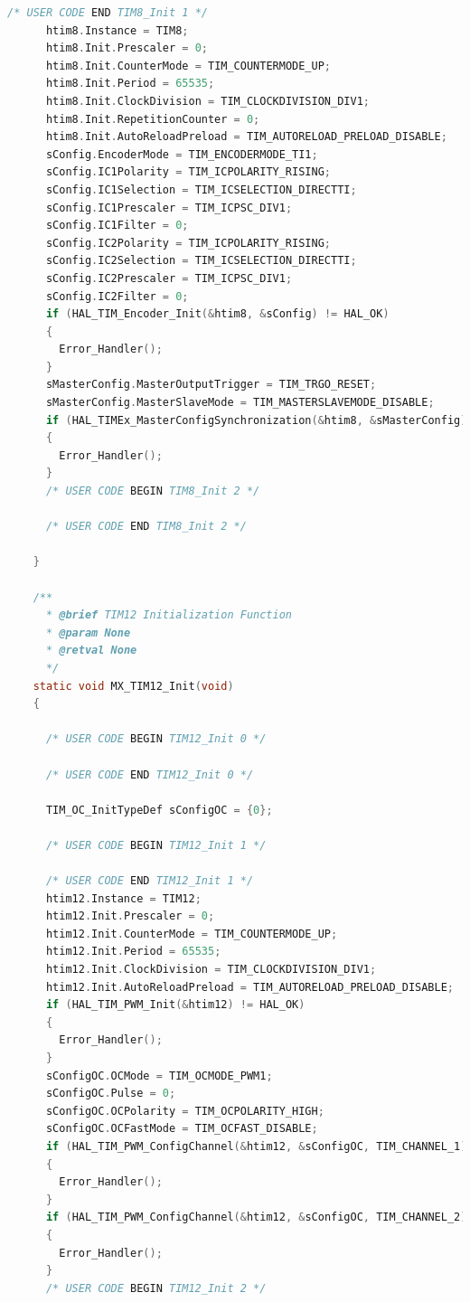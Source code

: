\begin{lstlisting}[language=C, caption=メインコード(main.c)]
      /* USER CODE END TIM8_Init 1 */
      htim8.Instance = TIM8;
      htim8.Init.Prescaler = 0;
      htim8.Init.CounterMode = TIM_COUNTERMODE_UP;
      htim8.Init.Period = 65535;
      htim8.Init.ClockDivision = TIM_CLOCKDIVISION_DIV1;
      htim8.Init.RepetitionCounter = 0;
      htim8.Init.AutoReloadPreload = TIM_AUTORELOAD_PRELOAD_DISABLE;
      sConfig.EncoderMode = TIM_ENCODERMODE_TI1;
      sConfig.IC1Polarity = TIM_ICPOLARITY_RISING;
      sConfig.IC1Selection = TIM_ICSELECTION_DIRECTTI;
      sConfig.IC1Prescaler = TIM_ICPSC_DIV1;
      sConfig.IC1Filter = 0;
      sConfig.IC2Polarity = TIM_ICPOLARITY_RISING;
      sConfig.IC2Selection = TIM_ICSELECTION_DIRECTTI;
      sConfig.IC2Prescaler = TIM_ICPSC_DIV1;
      sConfig.IC2Filter = 0;
      if (HAL_TIM_Encoder_Init(&htim8, &sConfig) != HAL_OK)
      {
        Error_Handler();
      }
      sMasterConfig.MasterOutputTrigger = TIM_TRGO_RESET;
      sMasterConfig.MasterSlaveMode = TIM_MASTERSLAVEMODE_DISABLE;
      if (HAL_TIMEx_MasterConfigSynchronization(&htim8, &sMasterConfig) != HAL_OK)
      {
        Error_Handler();
      }
      /* USER CODE BEGIN TIM8_Init 2 */
    
      /* USER CODE END TIM8_Init 2 */
    
    }
    
    /**
      * @brief TIM12 Initialization Function
      * @param None
      * @retval None
      */
    static void MX_TIM12_Init(void)
    {
    
      /* USER CODE BEGIN TIM12_Init 0 */
    
      /* USER CODE END TIM12_Init 0 */
    
      TIM_OC_InitTypeDef sConfigOC = {0};
    
      /* USER CODE BEGIN TIM12_Init 1 */
    
      /* USER CODE END TIM12_Init 1 */
      htim12.Instance = TIM12;
      htim12.Init.Prescaler = 0;
      htim12.Init.CounterMode = TIM_COUNTERMODE_UP;
      htim12.Init.Period = 65535;
      htim12.Init.ClockDivision = TIM_CLOCKDIVISION_DIV1;
      htim12.Init.AutoReloadPreload = TIM_AUTORELOAD_PRELOAD_DISABLE;
      if (HAL_TIM_PWM_Init(&htim12) != HAL_OK)
      {
        Error_Handler();
      }
      sConfigOC.OCMode = TIM_OCMODE_PWM1;
      sConfigOC.Pulse = 0;
      sConfigOC.OCPolarity = TIM_OCPOLARITY_HIGH;
      sConfigOC.OCFastMode = TIM_OCFAST_DISABLE;
      if (HAL_TIM_PWM_ConfigChannel(&htim12, &sConfigOC, TIM_CHANNEL_1) != HAL_OK)
      {
        Error_Handler();
      }
      if (HAL_TIM_PWM_ConfigChannel(&htim12, &sConfigOC, TIM_CHANNEL_2) != HAL_OK)
      {
        Error_Handler();
      }
      /* USER CODE BEGIN TIM12_Init 2 */
    

\end{lstlisting}
